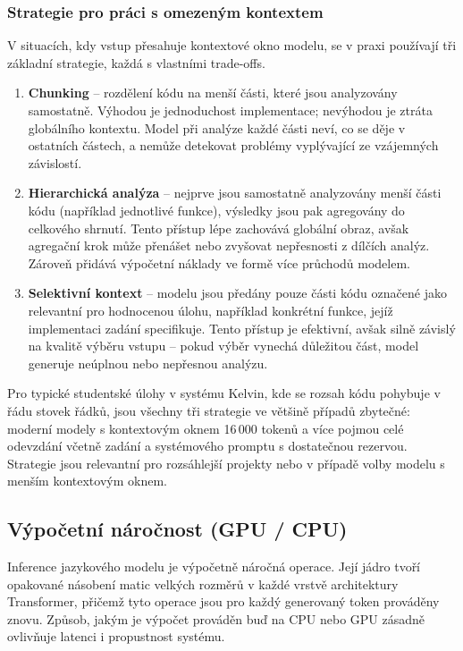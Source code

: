 \subsubsection*{Strategie pro práci s omezeným kontextem}

V situacích, kdy vstup přesahuje kontextové okno modelu, se v praxi používají tři základní strategie, každá s vlastními trade-offs.

\begin{enumerate}
    \item \textbf{Chunking} -- rozdělení kódu na menší části, které jsou analyzovány samostatně.
    Výhodou je jednoduchost implementace; nevýhodou je ztráta globálního kontextu.
    Model při analýze každé části neví, co se děje v ostatních částech, a nemůže detekovat problémy vyplývající ze vzájemných závislostí.

    \item \textbf{Hierarchická analýza} -- nejprve jsou samostatně analyzovány menší části kódu (například jednotlivé funkce), výsledky jsou pak agregovány do celkového shrnutí.
    Tento přístup lépe zachovává globální obraz, avšak agregační krok může přenášet nebo zvyšovat nepřesnosti z dílčích analýz.
    Zároveň přidává výpočetní náklady ve formě více průchodů modelem.

    \item \textbf{Selektivní kontext} -- modelu jsou předány pouze části kódu označené jako relevantní pro hodnocenou úlohu, například konkrétní funkce, jejíž implementaci zadání specifikuje.
    Tento přístup je efektivní, avšak silně závislý na kvalitě výběru vstupu -- pokud výběr vynechá důležitou část, model generuje neúplnou nebo nepřesnou analýzu.
\end{enumerate}

Pro typické studentské úlohy v systému Kelvin, kde se rozsah kódu pohybuje v řádu stovek řádků, jsou všechny tři strategie ve většině případů zbytečné: moderní modely s kontextovým oknem 16\,000 tokenů a více pojmou celé odevzdání včetně zadání a systémového promptu s dostatečnou rezervou.
Strategie jsou relevantní pro rozsáhlejší projekty nebo v případě volby modelu s menším kontextovým oknem.

\subsection{Výpočetní náročnost (GPU / CPU)}
\label{subsec:llm-computational-cost}

Inference jazykového modelu je výpočetně náročná operace.
Její jádro tvoří opakované násobení matic velkých rozměrů v každé vrstvě architektury Transformer, přičemž tyto operace jsou pro každý generovaný token prováděny znovu.
Způsob, jakým je výpočet prováděn buď na CPU nebo GPU zásadně ovlivňuje latenci i propustnost systému.

